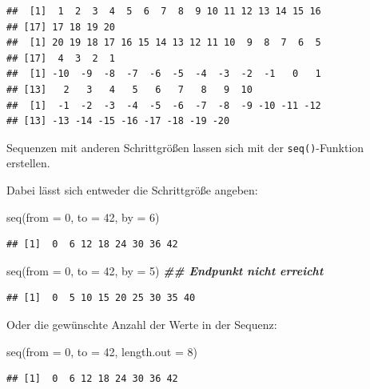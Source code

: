 \documentclass[
]{book}
\newenvironment{Shaded}{\begin{snugshade}}{\end{snugshade}}
\newcommand{\AttributeTok}[1]{\textcolor[rgb]{0.77,0.63,0.00}{#1}}
\newcommand{\DecValTok}[1]{\textcolor[rgb]{0.00,0.00,0.81}{#1}}
\newcommand{\DocumentationTok}[1]{\textcolor[rgb]{0.56,0.35,0.01}{\textbf{\textit{#1}}}}
\newcommand{\FunctionTok}[1]{\textcolor[rgb]{0.00,0.00,0.00}{#1}}
\newcommand{\NormalTok}[1]{#1}
\begin{document}
\begin{verbatim}
##  [1]  1  2  3  4  5  6  7  8  9 10 11 12 13 14 15 16
## [17] 17 18 19 20
##  [1] 20 19 18 17 16 15 14 13 12 11 10  9  8  7  6  5
## [17]  4  3  2  1
##  [1] -10  -9  -8  -7  -6  -5  -4  -3  -2  -1   0   1
## [13]   2   3   4   5   6   7   8   9  10
##  [1]  -1  -2  -3  -4  -5  -6  -7  -8  -9 -10 -11 -12
## [13] -13 -14 -15 -16 -17 -18 -19 -20
\end{verbatim}

Sequenzen mit anderen Schrittgrößen lassen sich mit der \texttt{seq()}-Funktion erstellen.

Dabei lässt sich entweder die Schrittgröße angeben:

\begin{Shaded}
\begin{Highlighting}[]
\FunctionTok{seq}\NormalTok{(}\AttributeTok{from =} \DecValTok{0}\NormalTok{, }\AttributeTok{to =} \DecValTok{42}\NormalTok{, }\AttributeTok{by =} \DecValTok{6}\NormalTok{)}
\end{Highlighting}
\end{Shaded}

\begin{verbatim}
## [1]  0  6 12 18 24 30 36 42
\end{verbatim}

\begin{Shaded}
\begin{Highlighting}[]
\FunctionTok{seq}\NormalTok{(}\AttributeTok{from =} \DecValTok{0}\NormalTok{, }\AttributeTok{to =} \DecValTok{42}\NormalTok{, }\AttributeTok{by =} \DecValTok{5}\NormalTok{) }\DocumentationTok{\#\# Endpunkt nicht erreicht }
\end{Highlighting}
\end{Shaded}

\begin{verbatim}
## [1]  0  5 10 15 20 25 30 35 40
\end{verbatim}

Oder die gewünschte Anzahl der Werte in der Sequenz:

\begin{Shaded}
\begin{Highlighting}[]
\FunctionTok{seq}\NormalTok{(}\AttributeTok{from =} \DecValTok{0}\NormalTok{, }\AttributeTok{to =} \DecValTok{42}\NormalTok{, }\AttributeTok{length.out =} \DecValTok{8}\NormalTok{)}
\end{Highlighting}
\end{Shaded}

\begin{verbatim}
## [1]  0  6 12 18 24 30 36 42
\end{verbatim}
\end{document}
